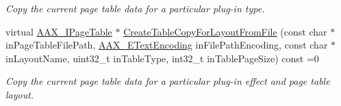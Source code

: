 \begin{DoxyCompactItemize}
\begin{DoxyCompactList}\small\item\em Copy the current page table data for a particular plug-\/in type. \end{DoxyCompactList}\item 
virtual \mbox{\hyperlink{a01849}{A\+A\+X\+\_\+\+I\+Page\+Table}} $\ast$ \mbox{\hyperlink{a01789_ac4da662371586ea85720e941eba6d629}{Create\+Table\+Copy\+For\+Layout\+From\+File}} (const char $\ast$in\+Page\+Table\+File\+Path, \mbox{\hyperlink{a00491_a8152e57310850693e4e7f00fc4922d74}{A\+A\+X\+\_\+\+E\+Text\+Encoding}} in\+File\+Path\+Encoding, const char $\ast$in\+Layout\+Name, uint32\+\_\+t in\+Table\+Type, int32\+\_\+t in\+Table\+Page\+Size) const =0
\begin{DoxyCompactList}\small\item\em Copy the current page table data for a particular plug-\/in effect and page table layout. \end{DoxyCompactList}\end{DoxyCompactItemize}
